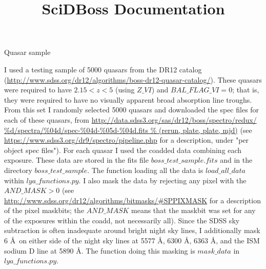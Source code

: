 \documentclass[12pt]{aastex}
\begin{document}
\title{SciDBoss Documentation}

\begin{section}{Quasar sample}

I used a testing sample of 5000 quasars from the DR12 catalog (\url{http://www.sdss.org/dr12/algorithms/boss-dr12-quasar-catalog/}).
These quasars were required to have $2.15 < z < 5$ (using $Z\_VI$) and $BAL\_FLAG\_VI = 0$; that is, they were required to have no visually apparent
broad absorption line troughs.  From this set I randomly selected 5000 quasars and downloaded the spec files for each of these quasars,
from \url{http://data.sdss3.org/sas/dr12/boss/spectro/redux/ %d/spectra/%04d/spec-%04d-%05d-%04d.fits % (rerun, plate, plate, mjd)} 
(see \url{https://www.sdss3.org/dr9/spectro/pipeline.php} for a description, under "per object spec files").  For each quasar I used the coadded data combining each exposure.
These data are stored in the fits file $boss\_test\_sample.fits$ and in the directory $boss\_test\_sample$.  The function loading all the data is $load\_all\_data$ within
$lya\_functions.py$.  I also mask the data by rejecting any pixel with the $AND\_MASK > 0$ (see \url{http://www.sdss.org/dr12/algorithms/bitmasks/#SPPIXMASK} for a description of the pixel maskbits; the $AND\_MASK$
means that the maskbit was set for any of the exposures within the coadd, not necessarily all).  Since the SDSS sky subtraction is often inadequate around bright night
sky lines, I additionally mask 6 \AA\ on either side of the night sky lines at 5577 \AA, 6300 \AA, 6363 \AA, and the ISM sodium D line at 5890 \AA.
The function doing this masking is $mask\_data$ in $lya\_functions.py$.

\end{section}
\end{document}
